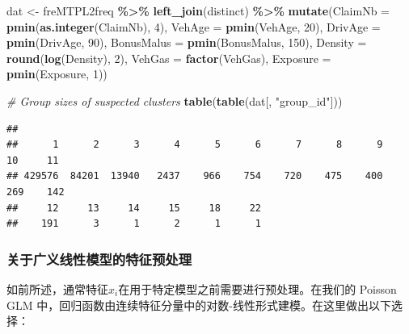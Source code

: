 \documentclass[
]{article}
\newenvironment{Shaded}{\begin{snugshade}}{\end{snugshade}}
\newcommand{\AttributeTok}[1]{\textcolor[rgb]{0.13,0.29,0.53}{#1}}
\newcommand{\CommentTok}[1]{\textcolor[rgb]{0.56,0.35,0.01}{\textit{#1}}}
\newcommand{\DecValTok}[1]{\textcolor[rgb]{0.00,0.00,0.81}{#1}}
\newcommand{\FunctionTok}[1]{\textcolor[rgb]{0.13,0.29,0.53}{\textbf{#1}}}
\newcommand{\NormalTok}[1]{#1}
\newcommand{\OtherTok}[1]{\textcolor[rgb]{0.56,0.35,0.01}{#1}}
\newcommand{\SpecialCharTok}[1]{\textcolor[rgb]{0.81,0.36,0.00}{\textbf{#1}}}
\newcommand{\StringTok}[1]{\textcolor[rgb]{0.31,0.60,0.02}{#1}}
\begin{document}
\begin{Shaded}
\begin{Highlighting}[]
\NormalTok{dat }\OtherTok{\textless{}{-}}\NormalTok{ freMTPL2freq }\SpecialCharTok{\%\textgreater{}\%} 
  \FunctionTok{left\_join}\NormalTok{(distinct) }\SpecialCharTok{\%\textgreater{}\%} 
  \FunctionTok{mutate}\NormalTok{(}\AttributeTok{ClaimNb =} \FunctionTok{pmin}\NormalTok{(}\FunctionTok{as.integer}\NormalTok{(ClaimNb), }\DecValTok{4}\NormalTok{),}
         \AttributeTok{VehAge =} \FunctionTok{pmin}\NormalTok{(VehAge, }\DecValTok{20}\NormalTok{),}
         \AttributeTok{DrivAge =} \FunctionTok{pmin}\NormalTok{(DrivAge, }\DecValTok{90}\NormalTok{),}
         \AttributeTok{BonusMalus =} \FunctionTok{pmin}\NormalTok{(BonusMalus, }\DecValTok{150}\NormalTok{),}
         \AttributeTok{Density =} \FunctionTok{round}\NormalTok{(}\FunctionTok{log}\NormalTok{(Density), }\DecValTok{2}\NormalTok{),}
         \AttributeTok{VehGas =} \FunctionTok{factor}\NormalTok{(VehGas),}
         \AttributeTok{Exposure =} \FunctionTok{pmin}\NormalTok{(Exposure, }\DecValTok{1}\NormalTok{))}
\end{Highlighting}
\end{Shaded}

\begin{Shaded}
\begin{Highlighting}[]
\CommentTok{\# Group sizes of suspected clusters}
\FunctionTok{table}\NormalTok{(}\FunctionTok{table}\NormalTok{(dat[, }\StringTok{"group\_id"}\NormalTok{]))}
\end{Highlighting}
\end{Shaded}

\begin{verbatim}
## 
##      1      2      3      4      5      6      7      8      9     10     11 
## 429576  84201  13940   2437    966    754    720    475    400    269    142 
##     12     13     14     15     18     22 
##    191      3      1      2      1      1
\end{verbatim}

\subsubsection{关于广义线性模型的特征预处理}\label{ux5173ux4e8eux5e7fux4e49ux7ebfux6027ux6a21ux578bux7684ux7279ux5f81ux9884ux5904ux7406}

如前所述，通常特征\(x_i\)在用于特定模型之前需要进行预处理。在我们的
Poisson GLM
中，回归函数由连续特征分量中的对数-线性形式建模。在这里做出以下选择：
\end{document}
